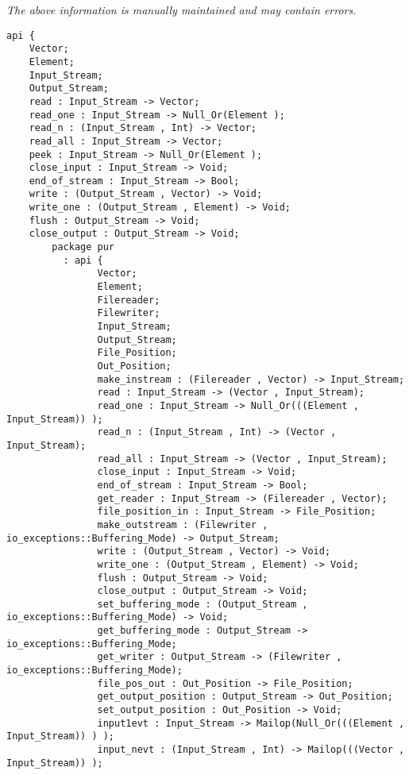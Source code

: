 \label{api:Winix\_File\_For\_Os}

{\tiny \it The above information is manually maintained and may contain errors.}
\begin{verbatim}
api {
    Vector;
    Element;
    Input_Stream;
    Output_Stream;
    read : Input_Stream -> Vector;
    read_one : Input_Stream -> Null_Or(Element );
    read_n : (Input_Stream , Int) -> Vector;
    read_all : Input_Stream -> Vector;
    peek : Input_Stream -> Null_Or(Element );
    close_input : Input_Stream -> Void;
    end_of_stream : Input_Stream -> Bool;
    write : (Output_Stream , Vector) -> Void;
    write_one : (Output_Stream , Element) -> Void;
    flush : Output_Stream -> Void;
    close_output : Output_Stream -> Void;
        package pur
          : api {
                Vector;
                Element;
                Filereader;
                Filewriter;
                Input_Stream;
                Output_Stream;
                File_Position;
                Out_Position;
                make_instream : (Filereader , Vector) -> Input_Stream;
                read : Input_Stream -> (Vector , Input_Stream);
                read_one : Input_Stream -> Null_Or(((Element , Input_Stream)) );
                read_n : (Input_Stream , Int) -> (Vector , Input_Stream);
                read_all : Input_Stream -> (Vector , Input_Stream);
                close_input : Input_Stream -> Void;
                end_of_stream : Input_Stream -> Bool;
                get_reader : Input_Stream -> (Filereader , Vector);
                file_position_in : Input_Stream -> File_Position;
                make_outstream : (Filewriter , io_exceptions::Buffering_Mode) -> Output_Stream;
                write : (Output_Stream , Vector) -> Void;
                write_one : (Output_Stream , Element) -> Void;
                flush : Output_Stream -> Void;
                close_output : Output_Stream -> Void;
                set_buffering_mode : (Output_Stream , io_exceptions::Buffering_Mode) -> Void;
                get_buffering_mode : Output_Stream -> io_exceptions::Buffering_Mode;
                get_writer : Output_Stream -> (Filewriter , io_exceptions::Buffering_Mode);
                file_pos_out : Out_Position -> File_Position;
                get_output_position : Output_Stream -> Out_Position;
                set_output_position : Out_Position -> Void;
                input1evt : Input_Stream -> Mailop(Null_Or(((Element , Input_Stream)) ) );
                input_nevt : (Input_Stream , Int) -> Mailop(((Vector , Input_Stream)) );

\end{verbatim}
